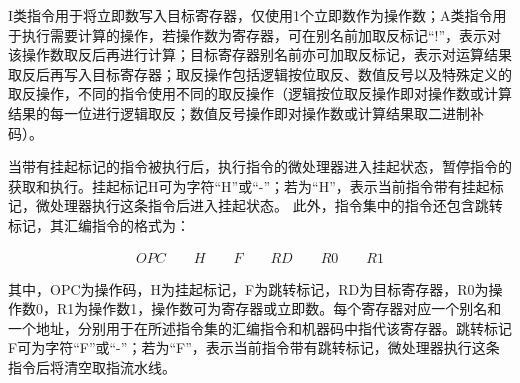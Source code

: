 I类指令用于将立即数写入目标寄存器，仅使用1个立即数作为操作数；A类指令用于执行需要计算的操作，若操作数为寄存器，可在别名前加取反标记“!”，表示对该操作数取反后再进行计算；目标寄存器别名前亦可加取反标记，表示对运算结果取反后再写入目标寄存器；取反操作包括逻辑按位取反、数值反号以及特殊定义的取反操作，不同的指令使用不同的取反操作（逻辑按位取反操作即对操作数或计算结果的每一位进行逻辑取反；数值反号操作即对操作数或计算结果取二进制补码）。

当带有挂起标记的指令被执行后，执行指令的微处理器进入挂起状态，暂停指令的获取和执行。挂起标记H可为字符“H”或“-”；若为“H”，表示当前指令带有挂起标记，微处理器执行这条指令后进入挂起状态。
此外，指令集中的指令还包含跳转标记，其汇编指令的格式为：

\begin{align}
    OPC \qquad H \qquad F \qquad RD \qquad R0 \qquad R1
\end{align}

其中，OPC为操作码，H为挂起标记，F为跳转标记，RD为目标寄存器，R0为操作数0，R1为操作数1，操作数可为寄存器或立即数。每个寄存器对应一个别名和一个地址，分别用于在所述指令集的汇编指令和机器码中指代该寄存器。跳转标记F可为字符“F”或“-”；若为“F”，表示当前指令带有跳转标记，微处理器执行这条指令后将清空取指流水线。


